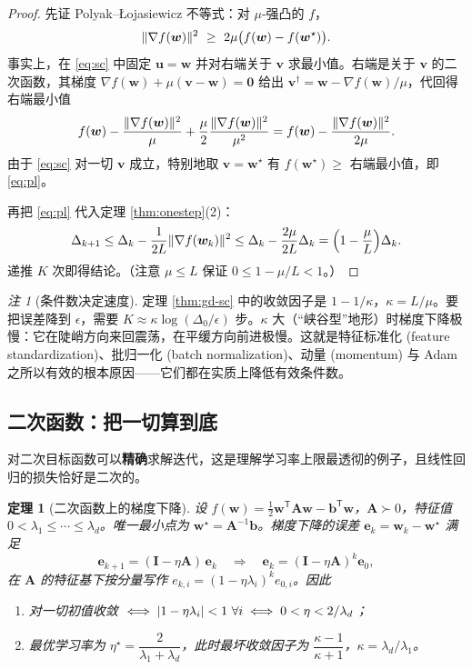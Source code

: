 \documentclass[UTF8,a4paper,11pt]{ctexart}
\theoremstyle{definition}
\theoremstyle{plain}
\newtheorem{theorem}[definition]{定理}
\theoremstyle{remark}
\newtheorem{remark}[definition]{注}
\DeclarePairedDelimiter{\norm}{\lVert}{\rVert}
\DeclarePairedDelimiter{\abs}{\lvert}{\rvert}
\newcommand{\T}{^{\mathsf{T}}}
\newcommand{\eng}[1]{\textup{(#1)}}
\begin{document}
\begin{proof}
先证 Polyak--Łojasiewicz 不等式：对 $\mu$-强凸的 $f$，
\begin{equation}\label{eq:pl}
  \norm{\nabla f(\bm{w})}^2\ \ge\ 2\mu\big(f(\bm{w})-f(\bm{w}^\star)\big).
\end{equation}
事实上，在 \eqref{eq:sc} 中固定 $\bm{u}=\bm{w}$ 并对右端关于 $\bm{v}$ 求最小值。右端是关于 $\bm{v}$ 的二次函数，其梯度 $\nabla f(\bm{w})+\mu(\bm{v}-\bm{w})=\bm{0}$ 给出 $\bm{v}^\dagger=\bm{w}-\nabla f(\bm{w})/\mu$，代回得右端最小值
\[
  f(\bm{w})-\frac{\norm{\nabla f(\bm{w})}^2}{\mu}+\frac{\mu}{2}\frac{\norm{\nabla f(\bm{w})}^2}{\mu^2}
  =f(\bm{w})-\frac{\norm{\nabla f(\bm{w})}^2}{2\mu}.
\]
由于 \eqref{eq:sc} 对一切 $\bm{v}$ 成立，特别地取 $\bm{v}=\bm{w}^\star$ 有 $f(\bm{w}^\star)\ge$ 右端最小值，即 \eqref{eq:pl}。

再把 \eqref{eq:pl} 代入定理 \ref{thm:onestep}(2)：
\[
  \Delta_{k+1}\le\Delta_k-\frac{1}{2L}\norm{\nabla f(\bm{w}_k)}^2
  \le\Delta_k-\frac{2\mu}{2L}\Delta_k=\Big(1-\frac{\mu}{L}\Big)\Delta_k .
\]
递推 $K$ 次即得结论。（注意 $\mu\le L$ 保证 $0\le1-\mu/L<1$。）
\end{proof}

\begin{remark}[条件数决定速度]
定理 \ref{thm:gd-sc} 中的收敛因子是 $1-1/\kappa$，$\kappa=L/\mu$。要把误差降到 $\epsilon$，需要
$K\approx\kappa\log(\Delta_0/\epsilon)$ 步。$\kappa$ 大（“峡谷型”地形）时梯度下降极慢：它在陡峭方向来回震荡，在平缓方向前进极慢。这就是特征标准化 \eng{feature standardization}、批归一化 \eng{batch normalization}、动量 \eng{momentum} 与 Adam 之所以有效的根本原因——它们都在实质上降低有效条件数。
\end{remark}

\subsection{二次函数：把一切算到底}

对二次目标函数可以\textbf{精确}求解迭代，这是理解学习率上限最透彻的例子，且线性回归的损失恰好是二次的。

\begin{theorem}[二次函数上的梯度下降]\label{thm:gd-quad}
设 $f(\bm{w})=\tfrac12\bm{w}\T\bm{A}\bm{w}-\bm{b}\T\bm{w}$，$\bm{A}\succ0$，特征值 $0<\lambda_1\le\cdots\le\lambda_d$。唯一最小点为 $\bm{w}^\star=\bm{A}^{-1}\bm{b}$。梯度下降的误差 $\bm{e}_k=\bm{w}_k-\bm{w}^\star$ 满足
\begin{equation}\label{eq:quad-err}
  \bm{e}_{k+1}=(\bm{I}-\eta\bm{A})\,\bm{e}_k
  \quad\Longrightarrow\quad
  \bm{e}_k=(\bm{I}-\eta\bm{A})^k\bm{e}_0 ,
\end{equation}
在 $\bm{A}$ 的特征基下按分量写作 $e_{k,i}=(1-\eta\lambda_i)^k e_{0,i}$。因此
\begin{enumerate}[label=(\arabic*)]
  \item 对一切初值收敛 $\iff\abs{1-\eta\lambda_i}<1\ \forall i\iff 0<\eta<2/\lambda_d$；
  \item 最优学习率为 $\eta^\star=\dfrac{2}{\lambda_1+\lambda_d}$，此时最坏收敛因子为 $\dfrac{\kappa-1}{\kappa+1}$，$\kappa=\lambda_d/\lambda_1$。
\end{enumerate}
\end{theorem}
\end{document}
